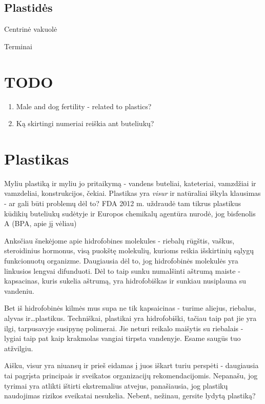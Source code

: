 \documentclass[]{book}
\providecommand{\tightlist}{%
  \setlength{\itemsep}{0pt}\setlength{\parskip}{0pt}}
\begin{document}
\hypertarget{plastides}{%
\section{Plastidės}\label{plastides}}

Centrinė vakuolė

Terminai

\hypertarget{todo-1}{%
\chapter{TODO}\label{todo-1}}

\begin{enumerate}
\def\labelenumi{\arabic{enumi}.}
\tightlist
\item
  Male and dog fertility - related to plastics?
\item
  Ką skirtingi numeriai reiškia ant buteliukų?
\end{enumerate}

\hypertarget{plastikas}{%
\chapter{Plastikas}\label{plastikas}}

Myliu plastiką ir myliu jo pritaikymą - vandens buteliai, kateteriai, vamzdžiai ir vamzdeliai, konstrukcijos, čekiai. Plastikas yra \emph{visur} ir natūraliai iškyla klausimas - ar gali būti problemų dėl to? FDA 2012 m. uždraudė tam tikrus plastikus kūdikių buteliukų sudėtyje ir Europos chemikalų agentūra nurodė, jog bisfenolis A (BPA, apie jį vėliau)

Anksčiau šnekėjome apie hidrofobines molekules - riebalų rūgštis, vaškus, steroidinius hormonus, visą puokštę molekulių, kurioms reikia išskirtinių sąlygų funkcionuotų organizme. Daugiausia dėl to, jog hidrofobinės molekulės yra linkusios lengvai difunduoti. Dėl to taip sunku numalšinti aštrumą maiste - kapsacinas, kuris sukelia aštrumą, yra hidrofobiškas ir sunkiau nusiplauna su vandeniu.

Bet iš hidrofobinės kilmės mus supa ne tik kapsaicinas - turime aliejus, riebalus, alyvas ir\ldots{}plastikus. Techniškai, plastikai yra hidrofobiški, tačiau taip pat jie yra ilgi, tarpusavyje susipynę polimerai. Jie neturi reikalo maišytis su riebalais - lygiai taip pat kaip krakmolas vangiai tirpsta vandenyje. Esame saugūs tuo atžvilgiu.

Aišku, visur yra niuansų ir prieš eidamas į juos iškart turiu perspėti - daugiausia tai pagrįsta principais ir sveikatos organizacijų rekomendacijomis. Nepanašu, jog tyrimai yra atlikti ištirti ekstremalius atvejus, panašiausia, jog plastikų naudojimas rizikos sveikatai nesukelia. Nebent, nežinau, gersite lydytą plastiką?
\end{document}
